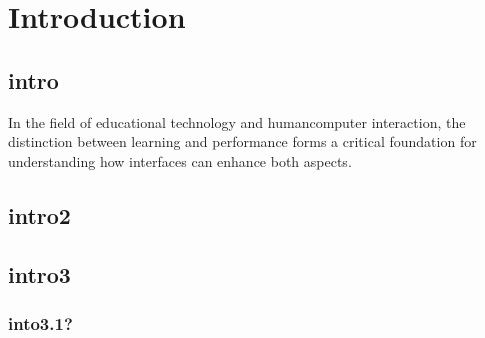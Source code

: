 \chapter{Introduction}

\section{intro}
In the field of educational technology and humancomputer interaction, the distinction between learning
and performance forms a critical foundation for understanding how interfaces can enhance both aspects.
\section{intro2}
\section{intro3}
\subsection{into3.1?}


\pagebreak
